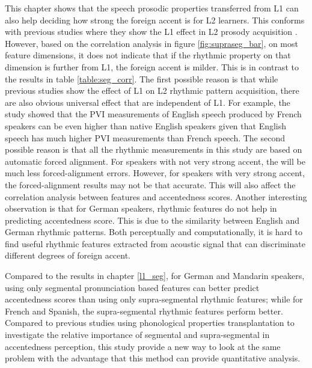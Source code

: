 This chapter shows that the speech prosodic properties transferred from L1 can also help deciding how strong the foreign accent is for L2 learners. This conforms with previous studies where they show the L1 effect in L2 prosody acquisition \citep{rasier2007prosodic,stockmal2005measures,white2007calibrating,li2014l2,ordin2015acquisition}. However, based on the correlation analysis in figure \ref{fig:supraseg_bar}, on most feature dimensions, it does not indicate that if the rhythmic property on that dimension is further from L1, the foreign accent is milder. This is in contrast to the results in table \ref{table:seg_corr}. The first possible reason is that while previous studies show the effect of L1 on L2 rhythmic pattern acquisition, there are also obvious universal effect that are independent of L1. For example, the study \cite{ordin2015acquisition} showed that the PVI measurements of English speech produced by French speakers can be even higher than native English speakers given that English speech has much higher PVI measurements than French speech. The second possible reason is that all the rhythmic measurements in this study are based on automatic forced alignment. For speakers with not very strong accent, the will be much less forced-alignment errors. However, for speakers with very strong accent, the forced-alignment results may not be that accurate. This will also affect the correlation analysis between features and accentedness scores. Another interesting observation is that for German speakers, rhythmic features do not help in predicting accentedness score. This is due to the similarity between English and German rhythmic patterns. Both perceptually and computationally, it is hard to find useful rhythmic features extracted from acoustic signal that can discriminate different degrees of foreign accent.

Compared to the results in chapter \ref{l1_seg}, for German and Mandarin speakers, using only segmental pronunciation based features can better predict accentedness scores than using only supra-segmental rhythmic features; while for French and Spanish, the supra-segmental rhythmic features perform better. Compared to previous studies using phonological properties transplantation to investigate the relative importance of segmental and supra-segmental in accentedness perception, this study provide a new way to look at the same problem with the advantage that this method can provide quantitative analysis.
 